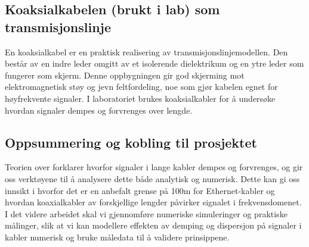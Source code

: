 \subsection{Koaksialkabelen (brukt i lab) som transmisjonslinje}
En koaksialkabel er en praktisk realisering av transmisjonslinjemodellen. Den består av en indre leder omgitt av et isolerende dielektrikum og en ytre leder som fungerer som skjerm. Denne oppbygningen gir god skjerming mot elektromagnetisk støy og jevn feltfordeling, noe som gjør kabelen egnet for høyfrekvente signaler. I laboratoriet brukes koaksialkabler for å undersøke hvordan signaler dempes og forvrenges over lengde.

\subsection{Oppsummering og kobling til prosjektet}

Teorien over forklarer hvorfor signaler i lange kabler dempes og forvrenges, og gir oss verktøyene til å analysere dette både analytisk og numerisk. Dette kan gi oss innsikt i hvorfor det er en anbefalt grense på 100m for Ethernet-kabler og hvordan koaxialkabler av forskjellige lengder påvirker signalet i frekvensdomenet. I det videre arbeidet skal vi gjennomføre numeriske simuleringer og praktiske målinger, slik at vi kan modellere effekten av demping og dispersjon på signaler i kabler numerisk og bruke måledata til å validere prinsippene.
